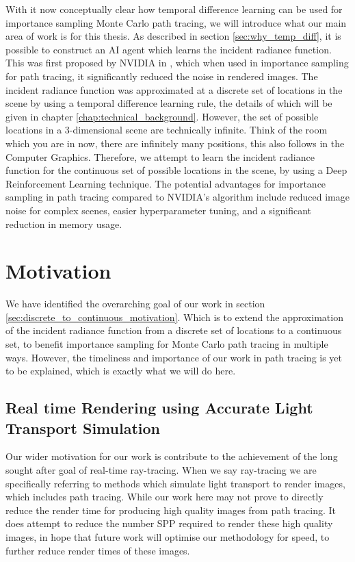 \documentclass[../dissertation.tex]{subfiles}
\begin{document}
With it now conceptually clear how temporal difference learning can be used for importance sampling Monte Carlo path tracing, we will introduce what our main area of work is for this thesis.  As described in section \ref{sec:why_temp_diff}, it is possible to construct an AI agent which learns the incident radiance function. This was first proposed by NVIDIA in \cite{dahm2017learning}, which when used in importance sampling for path tracing, it significantly reduced the noise in rendered images. The incident radiance function was approximated at a discrete set of locations in the scene by using a temporal difference learning rule, the details of which will be given in chapter \ref{chap:technical_background}. However, the set of possible locations in a 3-dimensional scene are technically infinite. Think of the room which you are in now, there are infinitely many positions, this also follows in the Computer Graphics. Therefore, we attempt to learn the incident radiance function for the continuous set of possible locations in the scene, by using a Deep Reinforcement Learning technique. The potential advantages for importance sampling in path tracing compared to NVIDIA's algorithm include reduced image noise for complex scenes, easier hyperparameter tuning, and a significant reduction in memory usage.

\section{Motivation}
\label{sec:motivation}

We have identified the overarching goal of our work in section \ref{sec:discrete_to_continuous_motivation}. Which is to extend the approximation of the incident radiance function from a discrete set of locations to a continuous set, to benefit importance sampling for Monte Carlo path tracing in multiple ways. However, the timeliness and importance of our work in path tracing is yet to be explained, which is exactly what we will do here.

\subsection{Real time Rendering using Accurate Light Transport Simulation}

Our wider motivation for our work is contribute to the achievement of  the long sought after goal of real-time ray-tracing. When we say ray-tracing we are specifically referring to methods which simulate light transport to render images, which includes path tracing. While our work here may not prove to directly reduce the render time for producing high quality images from path tracing. It does attempt to reduce the number SPP required to render these high quality images, in hope that future work will optimise our methodology for speed, to further reduce render times of these images.
\end{document}
